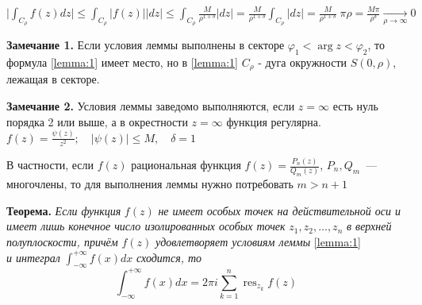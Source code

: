 \documentclass[a4paper, 12pt]{report}
\DeclareMathOperator*{\res}{res}
\begin{document}
\blacklozenge 
    $\displaystyle \bigg\lvert\int_{C_\rho} f(z)dz \bigg\rvert \leqslant \int_{C_\rho} |f(z)||dz| \leqslant \int_{C_\rho} \frac{M}{\rho^{1+\delta}}|dz| = \frac{M}{\rho^{1+\delta}} \int_{C_\rho} |dz| = \frac{M}{\rho^{1+\delta}} \; \pi \rho = \frac{M\pi}{\rho^\delta} \xrightarrow[\rho \to \infty]{} 0 $
\blacksquare \par\bigskip
\textbf{Замечание 1.} \quad
Если условия леммы выполнены в секторе $\varphi_1<\arg z < \varphi_2$, то формула \eqref{lemma:1} имеет место, но в \eqref{lemma:1} $C_\rho$ - дуга окружности $S(0, \rho)$, лежащая в секторе.

\par\bigskip
\textbf{Замечание 2.} \quad
Условия леммы заведомо выполняются, если $z=\infty$ есть нуль порядка 2 или выше, а в окрестности $z=\infty$ функция регулярна.\\
\blacklozenge \hspace{3 mm} $\displaystyle f(z) = \frac{\psi(z)}{z^2}; \quad |\psi(z)|\leqslant M, \quad \delta=1$ \quad \blacksquare

В частности, если $f(z)$ рациональная функция $\displaystyle f(z)=\frac{P_n(z)}{Q_m(z)}$, $P_n, Q_m$~--- многочлены, то для выполнения леммы нужно потребовать $m>n+1$
\par\bigskip
\textbf{Теорема. } \quad
    \textit{Если функция} $f(z)$ \textit{не имеет особых точек на действительной оси и имеет лишь конечное число изолированных особых точек}
    $z_1, z_2, \dotsc, z_n$ \textit{в верхней полуплоскости, причём} $f(z)$ \textit{удовлетворяет условиям леммы} \eqref{lemma:1} \\\textit{и интеграл}
    $\displaystyle \int_{-\infty}^{+\infty}f(x)dx$ \textit{сходится, то}
    \begin{equation}
        \int_{-\infty}^{+\infty}f(x)dx = 2\pi i \sum_{k=1}^n \res_{z_k} f(z)
    \end{equation}
\end{document}
